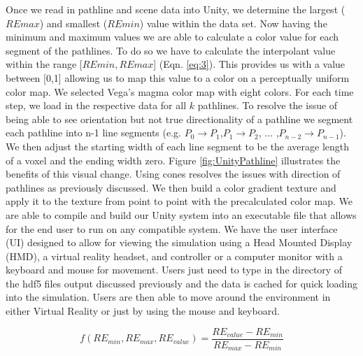 Once we read in pathline and scene data into Unity, we determine the largest (\ensuremath{REmax}) and smallest (\ensuremath{REmin}) value within the data set. Now having the minimum and maximum values we are able to calculate a color value for each segment of the pathlines. To do so we have to calculate the interpolant value within the range [\ensuremath{REmin, REmax}] (Eqn. \ref{eq:3}). This provides us with a value between [0,1] allowing us to  map this value to a color on a perceptually uniform color map. We selected Vega’s magma color map with eight colors\cite{colorschemes}. For each time step, we load in the respective data for all \ensuremath{k} pathlines. To resolve the issue of being able to see orientation but not true directionality of a pathline we segment each pathline into n-1 line segments (e.g. \ensuremath{P_0\rightarrow P_1},\ensuremath{P_1 \rightarrow P_2}, ... ,\ensuremath{P_{n-2} \rightarrow P_{n-1}}).
We then adjust the starting width of each line segment to be the average length of a voxel and the ending width zero. Figure \ref{fig:UnityPathline} illustrates the benefits of this visual change. Using cones resolves the issues with direction of pathlines as previously discussed. We then build a color gradient texture and apply it to the texture from point to point with the precalculated color map. We are able to compile and build our Unity system into an executable file that allows for the end user to run on any compatible system. We have the user interface (UI) designed to allow for viewing the simulation using a Head Mounted Display (HMD), a virtual reality headset, and controller or a computer monitor with a keyboard and mouse for movement. Users just need to type in the directory of the hdf5 files output discussed previously and the data is cached for quick loading into the simulation. Users are then able to move around the environment in either Virtual Reality or just by using the mouse and keyboard. 


\begin{equation} \label{eq:3}
f(RE_{min},RE_{max},RE_{value}) = \frac{RE_{value}-RE_{min}}{RE_{max}-RE_{min}}
\end{equation} 

